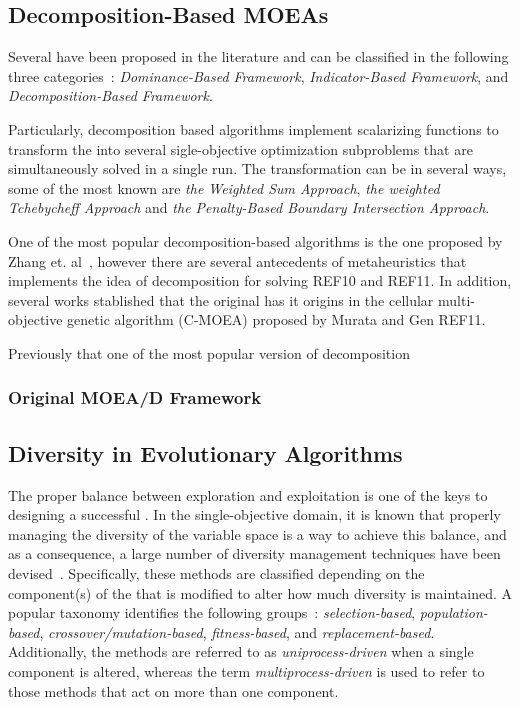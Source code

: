 \subsection{Decomposition-Based MOEAs}

Several \MOEAS{} have been proposed in the literature and can be classified in the following three categories~\cite{trivedi2016survey}:
%
\textit{Dominance-Based Framework}, \textit{Indicator-Based Framework}, and \textit{Decomposition-Based Framework}.
%

Particularly, decomposition based algorithms implement scalarizing functions to transform the \MOP{} into several sigle-objective optimization subproblems that are simultaneously solved in a single run.
%
The transformation can be in several ways, some of the most known are \textit{the Weighted Sum Approach}, \textit{the weighted Tchebycheff Approach} and \textit{the Penalty-Based Boundary Intersection Approach}.
%


One of the most popular decomposition-based algorithms is the one proposed by Zhang et. al~\cite{zhang2007moea}, however there are several antecedents of metaheuristics that implements the idea of decomposition for solving \MOPS{} REF10 and REF11.
%
In addition, several works stablished that the original \MOEAD{} has it origins in the cellular multi-objective genetic algorithm (C-MOEA) proposed by Murata and Gen REF11.
%



Previously that one of the most popular version of decomposition
\subsubsection{Original MOEA/D Framework}



\subsection{Diversity in Evolutionary Algorithms}

The proper balance between exploration and exploitation is one of the keys to designing a successful \EAS{}.
%
In the single-objective domain, it is known that properly managing the diversity of the variable space is a way to achieve this balance,
and as a consequence, a large number of diversity management techniques have been devised~\cite{Mohan:14}.
%
Specifically, these methods are classified depending on the component(s) of the \EA{} that is modified to alter how much diversity is maintained.
%
A popular taxonomy identifies the following groups~\cite{Joel:Crepinsek}: \textit{selection-based}, \textit{population-based}, 
\textit{crossover/mutation-based}, \textit{fitness-based}, and \textit{replacement-based}.
%
Additionally, the methods are referred to as \textit{uniprocess-driven} when a single component is altered, whereas the term
\textit{multiprocess-driven} is used to refer to those methods that act on more than one component.

